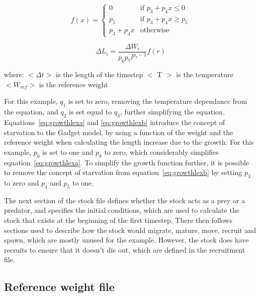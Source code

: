 \documentclass[10pt,titlepage]{article}
\begin{document}
\begin{equation}\label{eq:growthlexb}
f(x) =
\begin{cases}
  0
  & \textrm{if $p_{3} + p_{4}x \leq 0$} \\
  p_{5}
  & \textrm{if $p_{3} + p_{4}x \geq p_{5}$} \\
  p_{3} + p_{4}x
  & \textrm{otherwise}
\end{cases}
\end{equation}

\begin{equation}\label{eq:growthlexc}
\Delta L_i = \frac{\Delta W_i} {p_{6} p_{7} l^{p_{7} - 1}} f(r)
\end{equation}

where:\newline
$<\Delta t>$ is the length of the timestep\newline
$<$ T $>$ is the temperature\newline
$<W_{ref}>$ is the reference weight

\bigskip
For this example, $q_1$ is set to zero, removing the temperature dependance from the equation, and $q_2$ is set equal to $q_3$, further simplifying the equation.  Equations~\ref{eq:growthlexa} and \ref{eq:growthlexb} introduce the concept of starvation to the Gadget model, by using a function of the weight and the reference weight when calculating the length increase due to the growth.  For this example, $p_0$ is set to one and $p_8$ to zero, which considerably simplifies equation~\ref{eq:growthlexa}.  To simplify the growth function further, it is possible to remove the concept of starvation from equation~\ref{eq:growthlexb} by setting $p_3$ to zero and $p_4$ and $p_5$ to one.

\bigskip
The next section of the stock file defines whether the stock acts as a prey or a predator, and specifies the initial conditions, which are used to calculate the stock that exists at the beginning of the first timestep.  There then follows sections used to describe how the stock would migrate, mature, move, recruit and spawn, which are mostly unused for the example.  However, the stock does have recruits to ensure that it doesn't die out, which are defined in the recruitment file.

{\small }

\subsection{Reference weight file}
\end{document}
